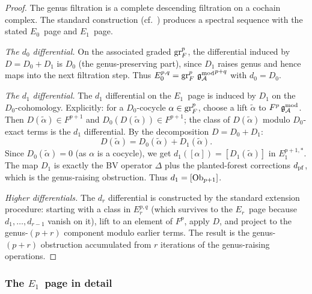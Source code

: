 \begin{proof}
The genus filtration is a complete descending filtration on a
cochain complex. The standard construction (cf.\
\cite[Ch.~5]{Wei94}) produces a spectral sequence with the
stated $E_0$~page and $E_1$~page.

\medskip\noindent\emph{The $d_0$ differential.}
On the associated graded $\operatorname{gr}^p_F$, the differential induced by
$D = D_0 + D_1$ is $D_0$ (the genus-preserving part), since
$D_1$ raises genus and hence maps into the next filtration step.
Thus $E_0^{p,q} = \operatorname{gr}^p_F\,{\mathfrak{g}_{\mathcal{A}}^{\mathrm{mod}}}^{p+q}$ with $d_0 = D_0$.

\medskip\noindent\emph{The $d_1$ differential.}
The $d_1$ differential on the $E_1$~page is induced by $D_1$
on the $D_0$-cohomology. Explicitly: for a $D_0$-cocycle
$\alpha \in \operatorname{gr}^p_F$, choose a lift $\widetilde{\alpha}$ to
$F^p\,\mathfrak{g}_{\mathcal{A}}^{\mathrm{mod}}$. Then $D(\widetilde{\alpha}) \in F^{p+1}$ and
$D_0(D(\widetilde{\alpha})) \in F^{p+1}$; the class of
$D(\widetilde{\alpha})$ modulo $D_0$-exact terms is the $d_1$
differential. By the decomposition $D = D_0 + D_1$:
\[
D(\widetilde{\alpha})
= D_0(\widetilde{\alpha}) + D_1(\widetilde{\alpha}).
\]
Since $D_0(\widetilde{\alpha}) = 0$ (as $\alpha$ is a cocycle),
we get $d_1([\alpha]) = [D_1(\widetilde{\alpha})]$ in
$E_1^{p+1,*}$. The map $D_1$ is exactly the BV operator
$\Delta$ plus the planted-forest corrections $d_{\mathrm{pf}}$, which is
the genus-raising obstruction. Thus $d_1 = [\mathrm{Ob}_{p+1}]$.

\medskip\noindent\emph{Higher differentials.}
The $d_r$ differential is constructed by the standard
extension procedure: starting with a class in $E_r^{p,q}$
(which survives to the $E_r$~page because $d_1, \ldots,
d_{r-1}$ vanish on it), lift to an element of $F^p$, apply
$D$, and project to the genus-$(p{+}r)$ component modulo
earlier terms. The result is the genus-$(p{+}r)$ obstruction
accumulated from $r$ iterations of the genus-raising operations.
\end{proof}

\subsubsection{The $E_1$~page in detail}

